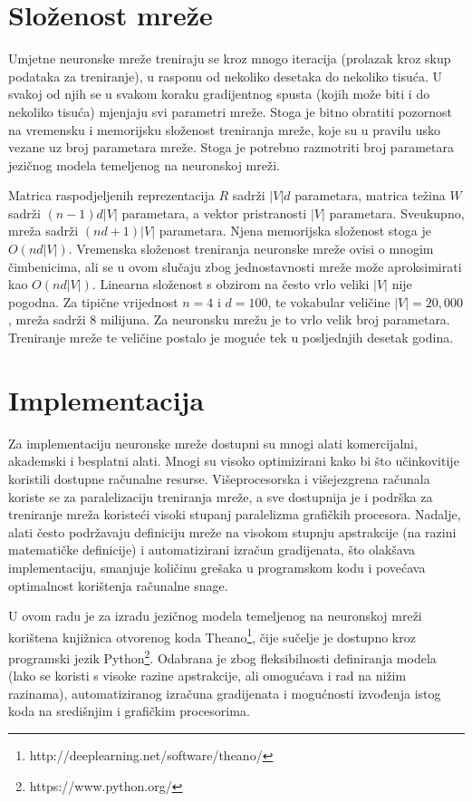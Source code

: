 \documentclass[times, utf8, diplomski, numeric]{fer}
\begin{document}
\section{Složenost mreže}

Umjetne neuronske mreže treniraju se kroz mnogo iteracija (prolazak kroz skup podataka za treniranje), u rasponu od nekoliko desetaka do nekoliko tisuća. U svakoj od njih se u svakom koraku gradijentnog spusta (kojih može biti i do nekoliko tisuća) mjenjaju svi parametri mreže. Stoga je bitno obratiti pozornost na vremensku i memorijsku složenost treniranja mreže, koje su u pravilu usko vezane uz broj parametara mreže. Stoga je potrebno razmotriti broj parametara jezičnog modela temeljenog na neuronskoj mreži.

Matrica raspodjeljenih reprezentacija $R$ sadrži $|V| d$ parametara, matrica težina $W$ sadrži $(n - 1) d |V|$ parametara, a vektor pristranosti $|V|$ parametara. Sveukupno, mreža sadrži $(n d + 1) |V|$ parametara. Njena memorijska složenost stoga je $O(n d |V|)$. Vremenska složenost treniranja neuronske mreže ovisi o mnogim čimbenicima, ali se u ovom slučaju zbog jednostavnosti mreže može aproksimirati kao $O(n d |V|)$. Linearna složenost s obzirom na često vrlo veliki $|V|$ nije pogodna. Za tipične vrijednost $n = 4$ i $d = 100$, te vokabular veličine $|V| = 20,000$, mreža sadrži 8 milijuna. Za neuronsku mrežu je to vrlo velik broj parametara. Treniranje mreže te veličine postalo je moguće tek u posljednjih desetak godina. 

\section{Implementacija}

Za implementaciju neuronske mreže dostupni su mnogi alati komercijalni, akademski i besplatni alati. Mnogi su visoko optimizirani kako bi što učinkovitije koristili dostupne računalne resurse. Višeprocesorska i višejezgrena računala koriste se za paralelizaciju treniranja mreže, a sve dostupnija je i podrška za treniranje mreža koristeći visoki stupanj paralelizma grafičkih procesora. Nadalje, alati često podržavaju definiciju mreže na visokom stupnju apstrakcije (na razini matematičke definicije) i automatizirani izračun gradijenata, što olakšava implementaciju, smanjuje količinu grešaka u programskom kodu i povećava optimalnost korištenja računalne snage.

U ovom radu je za izradu jezičnog modela temeljenog na neuronskoj mreži korištena knjižnica otvorenog koda Theano\footnote{http://deeplearning.net/software/theano/}, čije sučelje je dostupno kroz programski jezik Python\footnote{https://www.python.org/}. Odabrana je zbog fleksibilnosti definiranja modela (lako se koristi s visoke razine apstrakcije, ali omogućava i rad na nižim razinama), automatiziranog izračuna gradijenata i mogućnosti izvođenja istog koda na središnjim i grafičkim procesorima.
\end{document}
